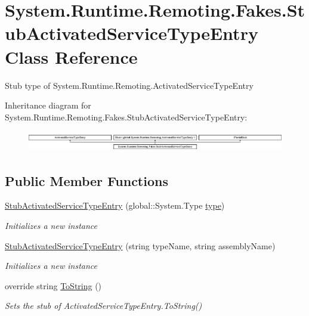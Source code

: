 \hypertarget{class_system_1_1_runtime_1_1_remoting_1_1_fakes_1_1_stub_activated_service_type_entry}{\section{System.\-Runtime.\-Remoting.\-Fakes.\-Stub\-Activated\-Service\-Type\-Entry Class Reference}
\label{class_system_1_1_runtime_1_1_remoting_1_1_fakes_1_1_stub_activated_service_type_entry}
}


Stub type of System.\-Runtime.\-Remoting.\-Activated\-Service\-Type\-Entry 


Inheritance diagram for System.\-Runtime.\-Remoting.\-Fakes.\-Stub\-Activated\-Service\-Type\-Entry\-:\begin{figure}[H]
\begin{center}
\leavevmode
\includegraphics[height=0.906149cm]{class_system_1_1_runtime_1_1_remoting_1_1_fakes_1_1_stub_activated_service_type_entry}
\end{center}
\end{figure}
\subsection*{Public Member Functions}
\begin{DoxyCompactItemize}
\item 
\hyperlink{class_system_1_1_runtime_1_1_remoting_1_1_fakes_1_1_stub_activated_service_type_entry_acb629b1331d770c50e7e1413da8fee4f}{Stub\-Activated\-Service\-Type\-Entry} (global\-::\-System.\-Type \hyperlink{jquery-1_810_82-vsdoc_8js_a3940565e83a9bfd10d95ffd27536da91}{type})
\begin{DoxyCompactList}\small\item\em Initializes a new instance\end{DoxyCompactList}\item 
\hyperlink{class_system_1_1_runtime_1_1_remoting_1_1_fakes_1_1_stub_activated_service_type_entry_afd5db9264a672e65280b055405b4596a}{Stub\-Activated\-Service\-Type\-Entry} (string type\-Name, string assembly\-Name)
\begin{DoxyCompactList}\small\item\em Initializes a new instance\end{DoxyCompactList}\item 
override string \hyperlink{class_system_1_1_runtime_1_1_remoting_1_1_fakes_1_1_stub_activated_service_type_entry_a968c7f61b5f14940e19f649870711411}{To\-String} ()
\begin{DoxyCompactList}\small\item\em Sets the stub of Activated\-Service\-Type\-Entry.\-To\-String()\end{DoxyCompactList}\end{DoxyCompactItemize}
